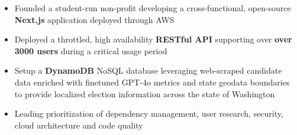 \begin{itemize}
    \item Founded a student-run non-profit developing a cross-functional, open-source \textbf{Next.js} application deployed through AWS
    \item Deployed a throttled, high availability \textbf{RESTful API} supporting over \textbf{over 3000 users} during a critical usage period
    \item Setup a \textbf{DynamoDB} NoSQL database leveraging web-scraped candidate data enriched with finetuned GPT-4o metrics and state geodata boundaries to provide localized election information across the state of Washington
    \item Leading prioritization of dependency management, user research, security, cloud architecture and code quality
\end{itemize}